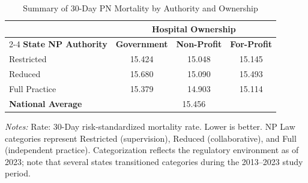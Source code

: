 \begin{table}[htbp]
    \centering
    \caption{Summary of 30-Day PN Mortality by Authority and Ownership}
    \label{tab:mortality_rate_pn}
    \vspace{0.2cm}
    \begin{tabular}{lccc}
        \toprule
        & \multicolumn{3}{c}{\textbf{Hospital Ownership}} \\
        \cmidrule(lr){2-4}
        \textbf{State NP Authority} & \textbf{Government} & \textbf{Non-Profit} & \textbf{For-Profit} \\
        \midrule
        Restricted & 15.424 & 15.048 & 15.145 \\
        Reduced & 15.680 & 15.090 & 15.493 \\
        Full Practice & 15.379 & 14.903 & 15.114 \\
        \midrule
        \textbf{National Average} & \multicolumn{3}{c}{15.456} \\
        \bottomrule
    \end{tabular}
    \vspace{0.1cm}
    \begin{minipage}{0.85\textwidth}
        \footnotesize \textit{Notes:} Rate: 30-Day risk-standardized mortality rate. Lower is better. NP Law categories represent Restricted (supervision), Reduced (collaborative), and Full (independent practice). Categorization reflects the regulatory environment as of 2023; note that several states transitioned categories during the 2013--2023 study period.
    \end{minipage}
\end{table}
